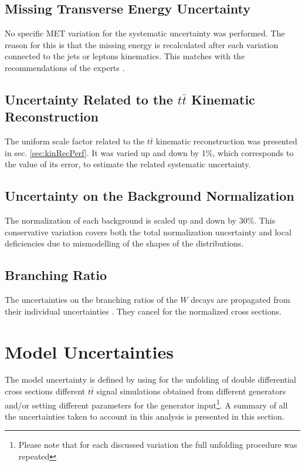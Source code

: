 \subsection{Missing Transverse Energy Uncertainty}

No specific MET variation for the systematic uncertainty was performed. The reason for this is that the missing energy is recalculated
after each variation connected to the jets or leptons kinematics. This matches with the recommendations of the experts \cite{CMS-PAS-JME-12-002}.

\subsection{Uncertainty Related to the $t\bar{t}$ Kinematic Reconstruction}

The uniform scale factor related to the $t\bar{t}$ kinematic reconstruction was presented in sec. \ref{sec:kinRecPerf}. It was varied 
up and down by 1\%, which corresponds to the value of its error, to estimate the related systematic uncertainty.

\subsection{Uncertainty on the Background Normalization}

The normalization of each background is scaled up and down by 30$\%$\cite{Asin2014Auth}. This conservative variation covers both the 
total normalization uncertainty and local deficiencies due to mismodelling of the shapes of the distributions. 

\subsection{Branching Ratio}

The uncertainties on the branching ratios of the $W$ decays are propagated from their individual uncertainties \cite{PDG-2012}.
They cancel for the normalized cross sections.
\section{Model Uncertainties}

The model uncertainty is defined by using for the unfolding of double differential cross sections different $t\bar{t}$ signal simulations 
obtained from different generators and/or setting
different parameters for the generator input\footnote{Please note that for each discussed variation the full unfolding procedure was
repeated}. A summary of all the uncertainties taken to account in this analysis is presented in this section.

